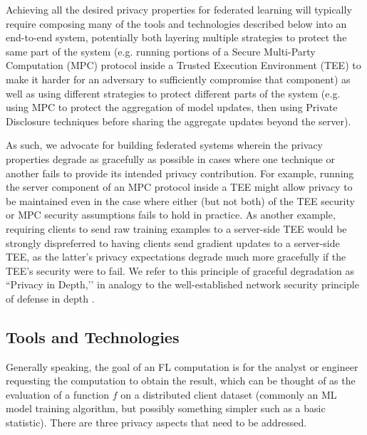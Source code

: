 
Achieving all the desired privacy properties for federated learning will typically require composing many of the tools and technologies described below into an end-to-end system, potentially both layering multiple strategies to protect the same part of the system (e.g. running portions of a Secure Multi-Party Computation (MPC) protocol inside a Trusted Execution Environment (TEE) to make it harder for an adversary to sufficiently compromise that component) as well as using different strategies to protect different parts of the system (e.g. using MPC to protect the aggregation of model updates, then using Private Disclosure techniques before sharing the aggregate updates beyond the server).

As such, we advocate for building federated systems wherein the privacy properties degrade as gracefully as possible in cases where one technique or another fails to provide its intended privacy contribution.  For example, running the server component of an MPC protocol inside a TEE might allow privacy to be maintained even in the case where either (but not both) of the TEE security or MPC security assumptions fails to hold in practice.  As another example, requiring clients to send raw training examples to a server-side TEE would be strongly dispreferred to having clients send gradient updates to a server-side TEE, as the latter's privacy expectations degrade much more gracefully if the TEE's security were to fail.  We refer to this principle of graceful degradation as ``Privacy in Depth,’’ in analogy to the well-established network security principle of defense in depth \cite{nsa2012defense}.

\subsection{Tools and Technologies}
\label{ssec:tools_tech}
Generally speaking, the goal of an FL computation is for the analyst or engineer requesting the computation to obtain the result, which can be thought of as the evaluation of a function $f$ on a distributed client dataset (commonly an ML model training algorithm, but possibly something simpler such as a basic statistic). There are three privacy aspects that need to be addressed.

